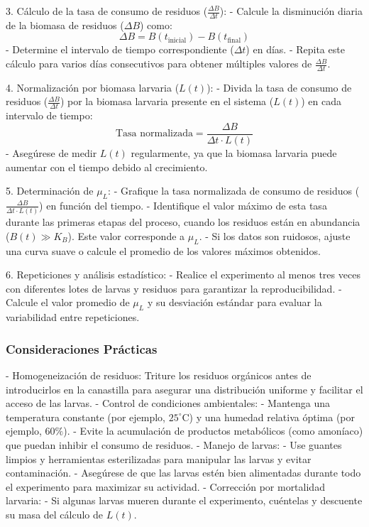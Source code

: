 \documentclass[12pt]{article}
\begin{document}
3. Cálculo de la tasa de consumo de residuos ($\frac{\Delta B}{\Delta t}$):
   - Calcule la disminución diaria de la biomasa de residuos ($\Delta B$) como:
     \[
     \Delta B = B(t_{\text{inicial}}) - B(t_{\text{final}})
     \]
   - Determine el intervalo de tiempo correspondiente ($\Delta t$) en días.
   - Repita este cálculo para varios días consecutivos para obtener múltiples valores de $\frac{\Delta B}{\Delta t}$.

4. Normalización por biomasa larvaria ($L(t)$):
   - Divida la tasa de consumo de residuos ($\frac{\Delta B}{\Delta t}$) por la biomasa larvaria presente en el sistema ($L(t)$) en cada intervalo de tiempo:
     \[
     \text{Tasa normalizada} = \frac{\Delta B}{\Delta t \cdot L(t)}
     \]
   - Asegúrese de medir $L(t)$ regularmente, ya que la biomasa larvaria puede aumentar con el tiempo debido al crecimiento.

5. Determinación de $\mu_L$:
   - Grafique la tasa normalizada de consumo de residuos ($\frac{\Delta B}{\Delta t \cdot L(t)}$) en función del tiempo.
   - Identifique el valor máximo de esta tasa durante las primeras etapas del proceso, cuando los residuos están en abundancia ($B(t) \gg K_B$). Este valor corresponde a $\mu_L$.
   - Si los datos son ruidosos, ajuste una curva suave o calcule el promedio de los valores máximos obtenidos.

6. Repeticiones y análisis estadístico:
   - Realice el experimento al menos tres veces con diferentes lotes de larvas y residuos para garantizar la reproducibilidad.
   - Calcule el valor promedio de $\mu_L$ y su desviación estándar para evaluar la variabilidad entre repeticiones.

\subsubsection{Consideraciones Prácticas}

- Homogeneización de residuos: Triture los residuos orgánicos antes de introducirlos en la canastilla para asegurar una distribución uniforme y facilitar el acceso de las larvas.
- Control de condiciones ambientales:
  - Mantenga una temperatura constante (por ejemplo, $25^\circ \text{C}$) y una humedad relativa óptima (por ejemplo, $60\%$).
  - Evite la acumulación de productos metabólicos (como amoníaco) que puedan inhibir el consumo de residuos.
- Manejo de larvas:
  - Use guantes limpios y herramientas esterilizadas para manipular las larvas y evitar contaminación.
  - Asegúrese de que las larvas estén bien alimentadas durante todo el experimento para maximizar su actividad.
- Corrección por mortalidad larvaria:
  - Si algunas larvas mueren durante el experimento, cuéntelas y descuente su masa del cálculo de $L(t)$.
\end{document}

